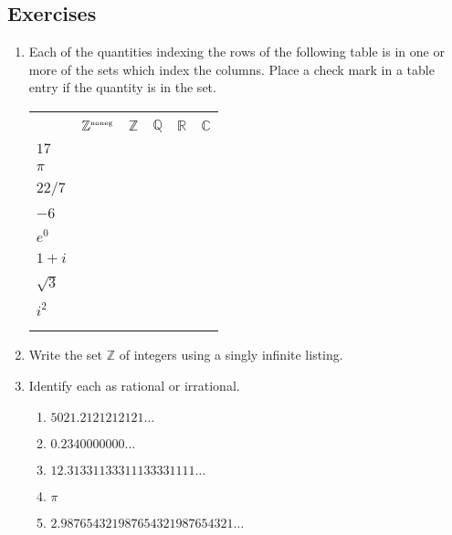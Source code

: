 \documentclass[10pt,]{book}
\theoremstyle{plain}
\theoremstyle{definition}
\theoremstyle{definition}
\numberwithin{equation}{section}
\newcommand{\hrulethin}  {\noalign{\hrule height 0.04em}}
\newcommand{\hrulemedium}{\noalign{\hrule height 0.07em}}
\renewcommand{\Naturals}{{\mathbb Z}^{\mbox{\tiny noneg}} }
\newcommand{\hint}[1]{ }
\newcommand{\Naturals}{{\mathbb N}}
\newcommand{\Integers}{{\mathbb Z}}
\newcommand{\Rationals}{{\mathbb Q}}
\newcommand{\Reals}{{\mathbb R}}
\newcommand{\Complexes}{{\mathbb C}}
\begin{document}
\subsection[{Exercises}]{Exercises}\label{exercises-1}
\leavevmode%
\begin{enumerate}[label=(\alph*)]
\item\hypertarget{li-1}{}
        Each of the quantities indexing the rows of the following table
        is in one or more of the sets which index the columns.  Place a 
        check mark in a table entry if the quantity is in the set.
        \begin{tabular}{llllll}
&&&&&\tabularnewline\hrulethin
&\(\Naturals\)&\(\Integers\)&\(\Rationals\)&\(\Reals\)&\(\Complexes\)\tabularnewline[0pt]
&&&&&\tabularnewline\hrulemedium
\(17\)&&&&&\tabularnewline[0pt]
&&&&&\tabularnewline\hrulethin
\(\pi\)&&&&&\tabularnewline[0pt]
&&&&&\tabularnewline\hrulethin
\(22/7\)&&&&&\tabularnewline[0pt]
&&&&&\tabularnewline\hrulethin
\(-6\)&&&&&\tabularnewline[0pt]
&&&&&\tabularnewline\hrulethin
\(e^0\)&&&&&\tabularnewline[0pt]
&&&&&\tabularnewline\hrulethin
\(1+i\)&&&&&\tabularnewline[0pt]
&&&&&\tabularnewline\hrulethin
\(\sqrt{3}\)&&&&&\tabularnewline[0pt]
&&&&&\tabularnewline\hrulethin
\(i^2\)&&&&&\tabularnewline[0pt]
&&&&&\tabularnewline\hrulethin
\end{tabular}

        \hint{Note that these sets contain one another, so if 
        you determine that a number is a natural number it is automatically 
        an integer and a rational number and a real number and a complex number\dots{}}
\item\hypertarget{li-2}{}
        Write the set \(\Integers\) of integers using a singly infinite
        listing.



        \hint{What the heck is meant by a ``singly infinite listing''?  To help you figure this out, note that
        \begin{equation*}
          \ldots -3, -2, -1, 0, 1, 2, 3, \ldots
        \end{equation*}
        is a doubly infinite listing.}
\item\hypertarget{li-3}{}
    Identify each as rational or irrational.

\begin{enumerate}[label=\roman*.]
\item\hypertarget{li-4}{}
          \(5021.2121212121\ldots\)
\item\hypertarget{li-5}{}
          \(0.2340000000\ldots\)
\item\hypertarget{li-6}{}
          \(12.31331133311133331111\ldots\)
\item\hypertarget{li-7}{}
          \(\pi\)
\item\hypertarget{li-8}{}
          \(2.987654321987654321987654321\ldots\)
\end{enumerate}


\end{enumerate}
\end{document}
